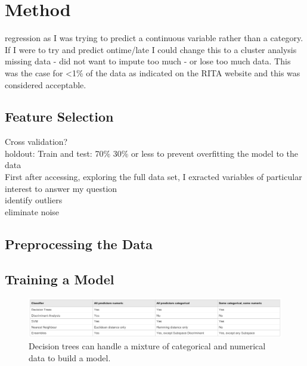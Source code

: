 \documentclass[a4paper, 11pt]{article}
\begin{document}
\section{Method}
regression as I was trying to predict a continuous variable rather than a category. If I were to try and predict ontime/late I could change this to a cluster analysis\\

missing data - did not want to impute too much - or lose too much data. This was the case for <1\% of the data as indicated on the RITA website and this was considered acceptable.\\



\subsection{Feature Selection}


Cross validation?\\
holdout: Train and test: 70\% 30\% or less to prevent overfitting the model to the data\\

First after accessing, exploring the full data set, I exracted variables of particular interest to answer my question\\
identify outliers\\
eliminate noise\\


\subsection{Preprocessing the Data}
\subsection{Training a Model}

\begin{figure}[H]
\begin{center}
\includegraphics[scale=0.5]{classifiertypes}
\caption{Decision trees can handle a mixture of categorical and numerical data to build a model.}
\label{classifiertypes}
\end{center}
\end{figure}
\end{document}
